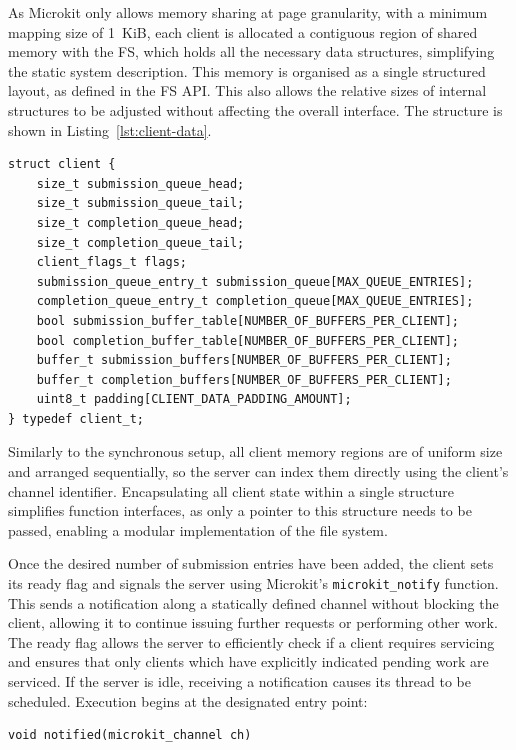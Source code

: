 As Microkit only allows memory sharing at page granularity, with a minimum mapping size of 1~KiB, each client is allocated a contiguous region of shared memory with the FS, which holds all the necessary data structures, simplifying the static system description. This memory is organised as a single structured layout, as defined in the FS API. This also allows the relative sizes of internal structures to be adjusted without affecting the overall interface. The structure is shown in Listing~\ref{lst:client-data}.

\vspace{0.5cm}
\begin{lstlisting}[caption={Client shared data structure.}, label={lst:client-data}]
struct client {
    size_t submission_queue_head;
    size_t submission_queue_tail;
    size_t completion_queue_head;
    size_t completion_queue_tail;
    client_flags_t flags;
    submission_queue_entry_t submission_queue[MAX_QUEUE_ENTRIES];
    completion_queue_entry_t completion_queue[MAX_QUEUE_ENTRIES];
    bool submission_buffer_table[NUMBER_OF_BUFFERS_PER_CLIENT];
    bool completion_buffer_table[NUMBER_OF_BUFFERS_PER_CLIENT];
    buffer_t submission_buffers[NUMBER_OF_BUFFERS_PER_CLIENT];
    buffer_t completion_buffers[NUMBER_OF_BUFFERS_PER_CLIENT];
    uint8_t padding[CLIENT_DATA_PADDING_AMOUNT];
} typedef client_t;
\end{lstlisting}

Similarly to the synchronous setup, all client memory regions are of uniform size and arranged sequentially, so the server can index them directly using the client’s channel identifier. Encapsulating all client state within a single structure simplifies function interfaces, as only a pointer to this structure needs to be passed, enabling a modular implementation of the file system. 

Once the desired number of submission entries have been added, the client sets its ready flag and signals the server using Microkit’s \texttt{microkit\_notify} function. This sends a notification along a statically defined channel without blocking the client, allowing it to continue issuing further requests or performing other work. The ready flag allows the server to efficiently check if a client requires servicing and ensures that only clients which have explicitly indicated pending work are serviced. 
\newpage
If the server is idle, receiving a notification causes its thread to be scheduled. Execution begins at the designated entry point: 

\vspace{0.4cm}
\begin{lstlisting}
void notified(microkit_channel ch)
\end{lstlisting}

